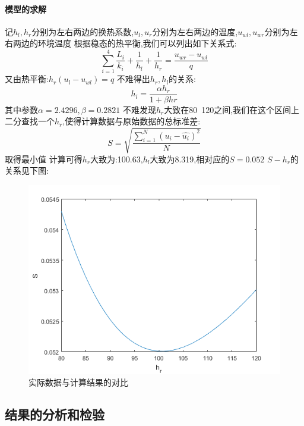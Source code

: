 \documentclass{cumcmthesis}
\begin{document}
        \paragraph{模型的求解}
    记\(h_l,h_r\)分别为左右两边的换热系数,\(u_l,u_r\)分别为左右两边的温度,\(u_{wl},u_{wr}\)分别为左右两边的环境温度
    根据稳态的热平衡,我们可以列出如下关系式:
    \[\sum_{i=1}^4 \frac{L_i}{k_i} + \frac{1}{h_l} + \frac{1}{h_r} = \frac{u_{wr}-u_{wl}}{q}\]
    又由热平衡:\( h_r(u_l-u_{wl}) = q\)
    不难得出\(h_r,h_l\)的关系:
    \[h_l = \frac{\alpha h_r}{1+\beta hr}\]
    其中参数\(\alpha = 2.4296 ,\beta = 0.2821\)
    不难发现\(h_r\)大致在80~120之间,我们在这个区间上二分查找一个\(h_r\),使得计算数据与原始数据的总标准差:
    \[S = \sqrt{\frac{\sum_{i=1}^{N}(u_i-\hat{u_i})^2}{N}}\]
    取得最小值
    计算可得\(h_r\)大致为:100.63,\(h_l\)大致为8.319,相对应的\(S = 0.052\)
    \(S-h_r\)的关系见下图:
    \begin{figure}[h] 
        \centering 
        \includegraphics[scale=0.9]{../figure/ques1Optimization.png} 
        \caption{实际数据与计算结果的对比}\label{optimization}    
    \end{figure}
        \subsection{结果的分析和检验} 
\end{document}
